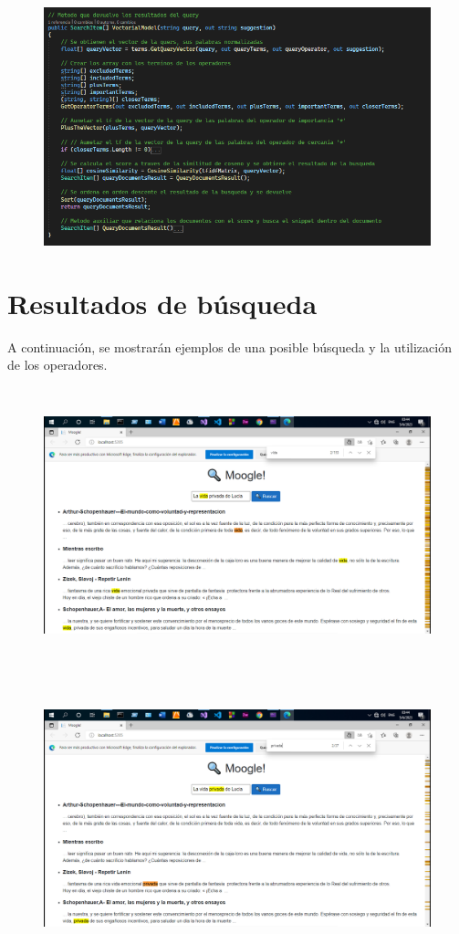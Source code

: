 \documentclass[a4paper,12pt]{report}
\begin{document}
\begin{figure}[h]
    \includegraphics*[width=15cm]{fotos/07 - VectorialModel.png}
\end{figure}

\section*{Resultados de búsqueda}

A continuación, se mostrarán ejemplos de una posible búsqueda y la utilización de los operadores.

\begin{figure}[h]
    \includegraphics*[width=15cm, height=8cm]{fotos/08 - Resultados (1).png}
\end{figure}

\newpage

\begin{figure}[h]
    \includegraphics*[width=15cm, height=8cm]{fotos/09 - Resultados (2).png}
\end{figure}
\end{document}
